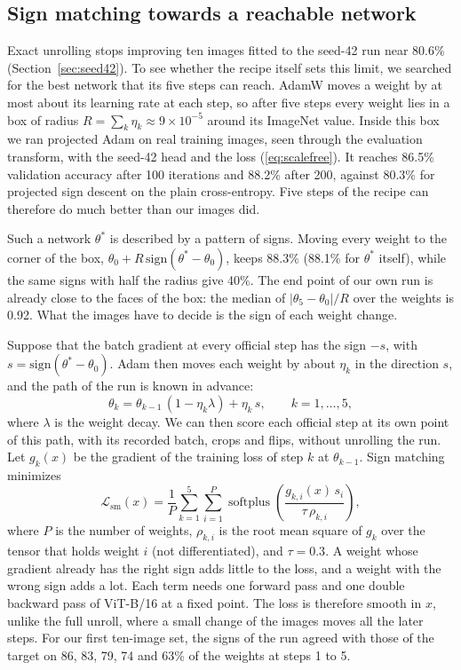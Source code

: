 \documentclass[journal]{IEEEtran}
\begin{document}
\subsection{Sign matching towards a reachable network}
\label{sec:signmatch}
Exact unrolling stops improving ten images fitted to the seed-42 run near 80.6\% (Section~\ref{sec:seed42}). To see
whether the recipe itself sets this limit, we searched for the best network that its five steps can reach. AdamW
moves a weight by at most about its learning rate at each step, so after five steps every weight lies in a box of
radius $R=\sum_k\eta_k\approx9\times10^{-5}$ around its ImageNet value. Inside this box we ran projected Adam on
real training images, seen through the evaluation transform, with the seed-42 head and the loss
(\ref{eq:scalefree}). It reaches 86.5\% validation accuracy after 100 iterations and 88.2\% after 200, against
80.3\% for projected sign descent on the plain cross-entropy. Five steps of the recipe can therefore do much better
than our images did.

Such a network $\theta^\ast$ is described by a pattern of signs. Moving every weight to the corner of the box,
$\theta_0+R\,\mathrm{sign}(\theta^\ast-\theta_0)$, keeps 88.3\% (88.1\% for $\theta^\ast$ itself), while the same
signs with half the radius give 40\%. The end point of our own run is already close to the faces of the box: the
median of $|\theta_5-\theta_0|/R$ over the weights is 0.92. What the images have to decide is the sign of each
weight change.

Suppose that the batch gradient at every official step has the sign $-s$, with $s=\mathrm{sign}(\theta^\ast-\theta_0)$.
Adam then moves each weight by about $\eta_k$ in the direction $s$, and the path of the run is known in advance:
\begin{equation}
\theta_k = \theta_{k-1}\,(1-\eta_k\lambda) + \eta_k\, s,\qquad k=1,\dots,5,
\label{eq:path}
\end{equation}
where $\lambda$ is the weight decay. We can then score each official step at its own point of this path, with its
recorded batch, crops and flips, without unrolling the run. Let $g_k(x)$ be the gradient of the training loss of
step $k$ at $\theta_{k-1}$. Sign matching minimizes
\begin{equation}
\mathcal{L}_{\mathrm{sm}}(x) = \frac{1}{P}\sum_{k=1}^{5}\sum_{i=1}^{P}
\operatorname{softplus}\!\left(\frac{g_{k,i}(x)\,s_i}{\tau\,\rho_{k,i}}\right),
\label{eq:sm}
\end{equation}
where $P$ is the number of weights, $\rho_{k,i}$ is the root mean square of $g_k$ over the tensor that holds weight
$i$ (not differentiated), and $\tau=0.3$. A weight whose gradient already has the right sign adds little to the
loss, and a weight with the wrong sign adds a lot. Each term needs one forward pass and one double backward pass of
ViT-B/16 at a fixed point. The loss is therefore smooth in $x$, unlike the full unroll, where a small change of the
images moves all the later steps. For our first ten-image set, the signs of the run agreed with those of the target
on 86, 83, 79, 74 and 63\% of the weights at steps 1 to 5.
\end{document}
